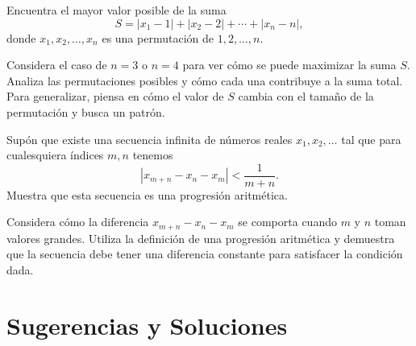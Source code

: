 \documentclass[11pt]{scrartcl}
\begin{document}
\begin{problem}
Encuentra el mayor valor posible de la suma
\[
S = |x_1 - 1| + |x_2 - 2| + \cdots + |x_n - n|,
\]
donde \( x_1, x_2, \dots, x_n \) es una permutación de \( 1, 2, \dots, n \).
\begin{hint}
    Considera el caso de \( n = 3 \) o \( n = 4 \) para ver cómo se puede maximizar la suma \( S \). Analiza las permutaciones posibles y cómo cada una contribuye a la suma total. Para generalizar, piensa en cómo el valor de \( S \) cambia con el tamaño de la permutación y busca un patrón.
\end{hint}
\end{problem}

\begin{problem}
Supón que existe una secuencia infinita de números reales \( x_1, x_2, \dots \) tal que para cualesquiera índices \( m, n \) tenemos
\[
|x_{m+n} - x_n - x_m| < \frac{1}{m + n}.
\]
Muestra que esta secuencia es una progresión aritmética.
\begin{hint}
    Considera cómo la diferencia \( x_{m+n} - x_n - x_m \) se comporta cuando \( m \) y \( n \) toman valores grandes. Utiliza la definición de una progresión aritmética y demuestra que la secuencia debe tener una diferencia constante para satisfacer la condición dada.
\end{hint}
\end{problem}


\section{Sugerencias y Soluciones}
\begin{enumerate}

\end{enumerate}
\end{document}
